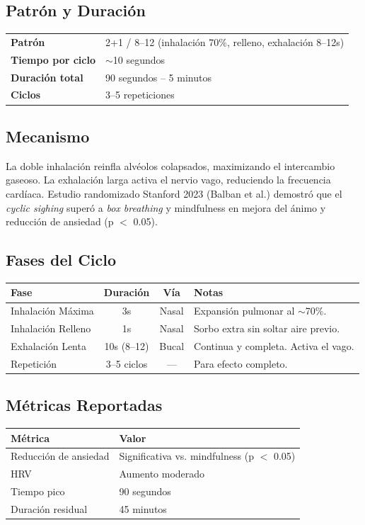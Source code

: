 \documentclass[12pt,a4paper]{article}
\begin{document}
\subsection*{Patrón y Duración}
\begin{tabularx}{\textwidth}{lX}
    \textbf{Patrón} & 2+1 / 8--12 (inhalación 70\%, relleno, exhalación 8--12s) \\
    \textbf{Tiempo por ciclo} & $\sim$10 segundos \\
    \textbf{Duración total} & 90 segundos -- 5 minutos \\
    \textbf{Ciclos} & 3--5 repeticiones \\
\end{tabularx}

\subsection*{Mecanismo}
La doble inhalación reinfla alvéolos colapsados, maximizando el intercambio
gaseoso. La exhalación larga activa el nervio vago, reduciendo la frecuencia
cardíaca. Estudio randomizado Stanford 2023 (Balban et al.) demostró que el
\textit{cyclic sighing} superó a \textit{box breathing} y mindfulness en mejora
del ánimo y reducción de ansiedad (p $<$ 0.05).

\subsection*{Fases del Ciclo}
\begin{tabularx}{\textwidth}{lccX}
    \toprule
    \textbf{Fase} & \textbf{Duración} & \textbf{Vía} & \textbf{Notas} \\
    \midrule
    Inhalación Máxima & 3s & Nasal & Expansión pulmonar al $\sim$70\%. \\
    Inhalación Relleno & 1s & Nasal & Sorbo extra sin soltar aire previo. \\
    Exhalación Lenta & 10s (8--12) & Bucal & Continua y completa. Activa el vago. \\
    Repetición & 3--5 ciclos & — & Para efecto completo. \\
    \bottomrule
\end{tabularx}

\subsection*{Métricas Reportadas}
\begin{tabularx}{\textwidth}{lX}
    \toprule
    \textbf{Métrica} & \textbf{Valor} \\
    \midrule
    Reducción de ansiedad & Significativa vs. mindfulness (p $<$ 0.05) \\
    HRV & Aumento moderado \\
    Tiempo pico & 90 segundos \\
    Duración residual & 45 minutos \\
    \bottomrule
\end{tabularx}
\end{document}
